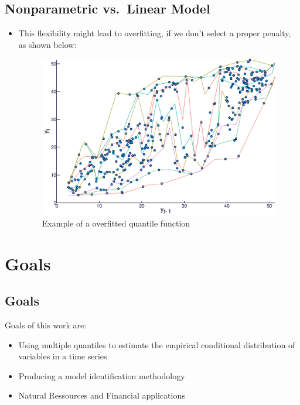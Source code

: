 \subsection{Nonparametric vs.~Linear
Model}\label{nonparametric-vs.linear-model-1}

\begin{itemize}
\tightlist
\item
  This flexibility might lead to overfitting, if we don't select a
  proper penalty, as shown below:

  \begin{figure}
          \centering     \includegraphics[width=0.6 \textwidth]{../Figuras/regressao-quantilica/icaraizinho-crossing-01}
  \caption{Example of a overfitted quantile function}
  \label{fig:convergence}
  \end{figure}
\end{itemize}

\section{Goals}\label{goals}

\subsection{Goals}\label{goals-1}

Goals of this work are:

\begin{itemize}
\item
  Using multiple quantiles to estimate the empirical conditional
  distribution of variables in a time series
\item
  Producing a model identification methodology
\item
  Natural Ressources and Financial applications
\end{itemize}
